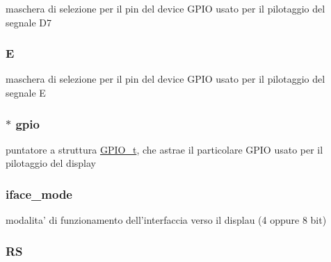 maschera di selezione per il pin del device G\+P\+I\+O usato per il pilotaggio del segnale D7 \hypertarget{struct_h_d44780___l_c_d__t_a851ed1cefdadae2e5069d1364ae8fc9e}{
\subsubsection[{E}]{ E}}\label{struct_h_d44780___l_c_d__t_a851ed1cefdadae2e5069d1364ae8fc9e}
maschera di selezione per il pin del device G\+P\+I\+O usato per il pilotaggio del segnale E \hypertarget{struct_h_d44780___l_c_d__t_acb3116190992a4d8d26545c103304d27}{
\subsubsection[{gpio}]{$\ast$ gpio}}\label{struct_h_d44780___l_c_d__t_acb3116190992a4d8d26545c103304d27}
puntatore a struttura \hyperlink{struct_g_p_i_o__t}{G\+P\+I\+O\+\_\+t}, che astrae il particolare G\+P\+I\+O usato per il pilotaggio del display \hypertarget{struct_h_d44780___l_c_d__t_a7c5a51b8cc5de5ee2cf42b884bd1bc67}{
\subsubsection[{iface\+\_\+mode}]{ iface\+\_\+mode}}\label{struct_h_d44780___l_c_d__t_a7c5a51b8cc5de5ee2cf42b884bd1bc67}
modalita' di funzionamento dell'interfaccia verso il displau (4 oppure 8 bit) \hypertarget{struct_h_d44780___l_c_d__t_a142ae0db638dca7ab42e2183a1311d32}{
\subsubsection[{R\+S}]{ R\+S}}\label{struct_h_d44780___l_c_d__t_a142ae0db638dca7ab42e2183a1311d32}
